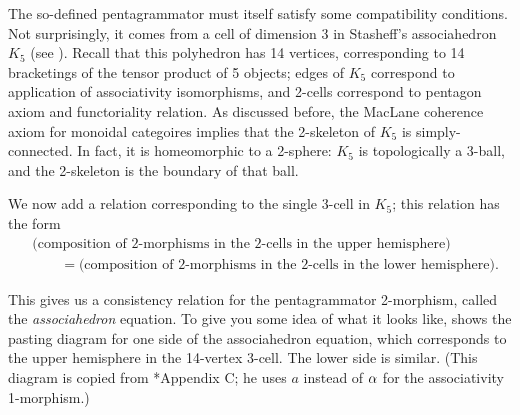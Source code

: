 The so-defined pentagrammator must itself satisfy some compatibility
conditions. Not surprisingly, it comes from a cell of dimension 3 in Stasheff's
associahedron $K_5$ (see ). Recall that  this polyhedron has
14 vertices, corresponding to 14 bracketings of the tensor product of 5
objects; edges of $K_5$  correspond to application of associativity
isomorphisms, and 2-cells correspond to  pentagon axiom and functoriality
relation. As discussed before, the MacLane coherence axiom for monoidal
categoires implies that the 2-skeleton of $K_5$ is simply-connected.  In fact,
it is homeomorphic to a 2-sphere: $K_5$ is topologically a 3-ball, and the
2-skeleton is the boundary of that ball.

We now add a relation corresponding to the single 3-cell in $K_5$;
this relation has the form
\begin{align*}
  &\text{(composition
  of 2-morphisms in the 2-cells in the upper hemisphere)}\\
  & \qquad =
  \text{(composition of 2-morphisms in the 2-cells in the lower hemisphere)}.
\end{align*}

This gives us a consistency relation for the pentagrammator 2-morphism, called
the \emph{associahedron} equation. To give you some idea of what it looks like,
 shows the pasting diagram for one side of the
associahedron equation, which corresponds to the upper hemisphere in the
14-vertex 3-cell. The lower side is similar. (This diagram is copied from
*{Appendix C}; he uses $a$ instead of $\alpha$ for the
associativity 1-morphism.)

